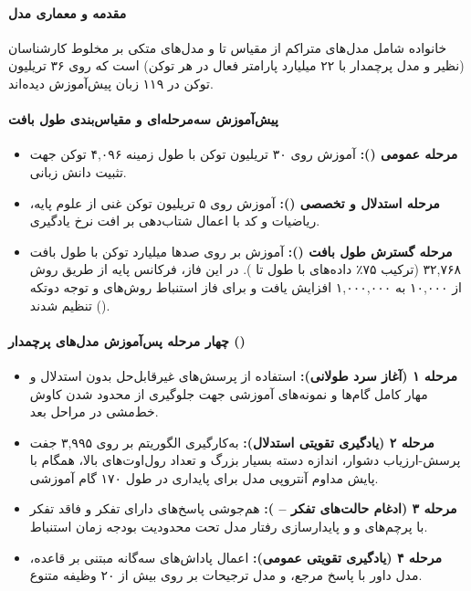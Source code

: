 \item {}

\paragraph*{مقدمه و معماری مدل}
خانواده  \cite{qwen2025qwen3} شامل مدل‌های متراکم از مقیاس  تا  و مدل‌های متکی بر مخلوط کارشناسان (نظیر  و مدل پرچمدار  با ۲۲ میلیارد پارامتر فعال در هر توکن) است که روی ۳۶ تریلیون توکن در ۱۱۹ زبان پیش‌آموزش دیده‌اند.

\paragraph*{پیش‌آموزش سه‌مرحله‌ای و مقیاس‌بندی طول بافت}
\begin{itemize}
    \item \textbf{مرحله عمومی ():} آموزش روی ۳۰ تریلیون توکن با طول زمینه ۴,۰۹۶ توکن جهت تثبیت دانش زبانی.
    \item \textbf{مرحله استدلال و تخصصی ():} آموزش روی ۵ تریلیون توکن غنی از علوم پایه، ریاضیات و کد با اعمال شتاب‌دهی بر افت نرخ یادگیری.
    \item \textbf{مرحله گسترش طول بافت ():} آموزش بر روی صدها میلیارد توکن با طول بافت ۳۲,۷۶۸ (ترکیب ۷۵٪ داده‌های با طول  تا ). در این فاز، فرکانس پایه  از طریق روش  از ۱۰,۰۰۰ به ۱,۰۰۰,۰۰۰ افزایش یافت و برای فاز استنباط روش‌های  و توجه دوتکه () تنظیم شدند.
\end{itemize}

\paragraph*{چهار مرحله پس‌آموزش مدل‌های پرچمدار ()}
\begin{itemize}
    \item \textbf{مرحله ۱ (آغاز سرد  طولانی):} استفاده از پرسش‌های غیرقابل‌حل بدون استدلال و مهار کامل گام‌ها و نمونه‌های آموزشی جهت جلوگیری از محدود شدن کاوش خط‌مشی در مراحل بعد.
    \item \textbf{مرحله ۲ (یادگیری تقویتی استدلال):} به‌کارگیری الگوریتم  بر روی ۳,۹۹۵ جفت پرسش-ارزیاب دشوار، اندازه دسته بسیار بزرگ و تعداد رول‌اوت‌های بالا، همگام با پایش مداوم آنتروپی مدل برای پایداری در طول ۱۷۰ گام آموزشی.
    \item \textbf{مرحله ۳ (ادغام حالت‌های تفکر -- ):} هم‌جوشی پاسخ‌های دارای تفکر و فاقد تفکر با پرچم‌های  و  و پایدارسازی رفتار مدل تحت محدودیت بودجه زمان استنباط.
    \item \textbf{مرحله ۴ (یادگیری تقویتی عمومی):} اعمال پاداش‌های سه‌گانه مبتنی بر قاعده، مدل داور با پاسخ مرجع، و مدل ترجیحات بر روی بیش از ۲۰ وظیفه متنوع.
\end{itemize}

